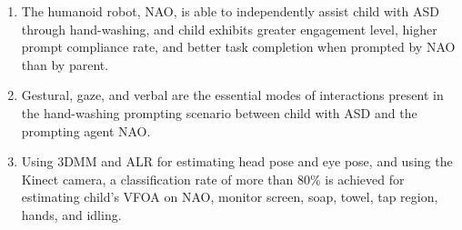 \begin{enumerate}
	\item The humanoid robot, NAO, is able to independently assist child with ASD through hand-washing, and child exhibits greater engagement level, higher prompt compliance rate, and better task completion when prompted by NAO than by parent.
	
	\item Gestural, gaze, and verbal are the essential modes of interactions present in the hand-washing prompting scenario between child with ASD and the prompting agent NAO.
	
	\item Using 3DMM and ALR for estimating head pose and eye pose, and using the Kinect camera, a classification rate of more than 80\% is achieved for estimating child's VFOA on NAO, monitor screen, soap, towel, tap region, hands, and idling.
	
\end{enumerate}
